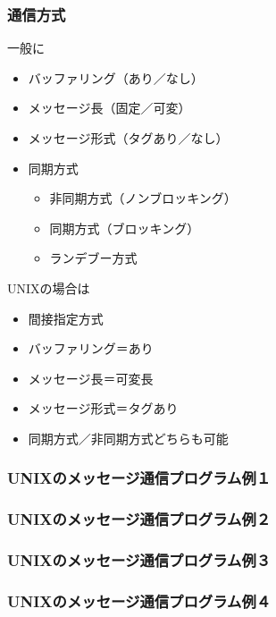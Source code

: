 \documentclass{beamer}                   %
\begin{document}
\begin{frame}
  \frametitle{通信方式}
  一般に
  \begin{itemize}
  \item バッファリング（あり／なし）
  \item メッセージ長（固定／可変）
  \item メッセージ形式（タグあり／なし）
  \item 同期方式
    \begin{itemize}
    \item 非同期方式（ノンブロッキング）
    \item 同期方式（ブロッキング）
    \item ランデブー方式
    \end{itemize}
  \end{itemize}

  UNIXの場合は
  \begin{itemize}
  \item 間接指定方式
  \item バッファリング＝あり
  \item メッセージ長＝可変長
  \item メッセージ形式＝タグあり
  \item 同期方式／非同期方式どちらも可能
  \end{itemize}
\end{frame}

\begin{frame}
  \frametitle{UNIXのメッセージ通信プログラム例１}
\end{frame}

\begin{frame}
  \frametitle{UNIXのメッセージ通信プログラム例２}
\end{frame}

\begin{frame}
  \frametitle{UNIXのメッセージ通信プログラム例３}
\end{frame}

\begin{frame}
  \frametitle{UNIXのメッセージ通信プログラム例４}
\end{frame}
\end{document}
